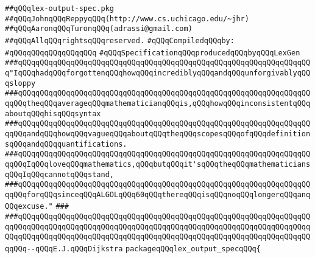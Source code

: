\label{src/app/future-lex/src/backends/lex-output-spec.pkg}
\verb|##qQQqlex-output-spec.pkg|\newline
\verb|##qQQqJohnqQQqReppyqQQq(http://www.cs.uchicago.edu/~jhr)|\newline
\verb|##qQQqAaronqQQqTuronqQQq(adrassi@gmail.com)|\newline
\verb|##qQQqAllqQQqrightsqQQqreserved.|\newline
\newline
\verb|#qQQqCompiledqQQqby:|\newline
\verb|#qQQqqQQqqQQqqQQqqQQq|\newline
\newline
\verb|#qQQqSpecificationqQQqproducedqQQqbyqQQqLexGen|\newline
\newline
\verb|###qQQqqQQqqQQqqQQqqQQqqQQqqQQqqQQqqQQqqQQqqQQqqQQqqQQqqQQqqQQqqQQqqQQq"IqQQqhadqQQqforgottenqQQqhowqQQqincrediblyqQQqandqQQqunforgivablyqQQqsloppy|\newline
\verb|###qQQqqQQqqQQqqQQqqQQqqQQqqQQqqQQqqQQqqQQqqQQqqQQqqQQqqQQqqQQqqQQqqQQqqQQqtheqQQqaverageqQQqmathematicianqQQqis,qQQqhowqQQqinconsistentqQQqaboutqQQqhisqQQqsyntax|\newline
\verb|###qQQqqQQqqQQqqQQqqQQqqQQqqQQqqQQqqQQqqQQqqQQqqQQqqQQqqQQqqQQqqQQqqQQqqQQqandqQQqhowqQQqvagueqQQqaboutqQQqtheqQQqscopesqQQqofqQQqdefinitionsqQQqandqQQqquantifications.|\newline
\verb|###qQQqqQQqqQQqqQQqqQQqqQQqqQQqqQQqqQQqqQQqqQQqqQQqqQQqqQQqqQQqqQQqqQQqqQQqIqQQqloveqQQqmathematics,qQQqbutqQQqit'sqQQqtheqQQqmathematiciansqQQqIqQQqcannotqQQqstand,|\newline
\verb|###qQQqqQQqqQQqqQQqqQQqqQQqqQQqqQQqqQQqqQQqqQQqqQQqqQQqqQQqqQQqqQQqqQQqqQQqforqQQqsinceqQQqALGOLqQQq60qQQqthereqQQqisqQQqnoqQQqlongerqQQqanqQQqexcuse."|\newline
\verb|###|\newline
\verb|###qQQqqQQqqQQqqQQqqQQqqQQqqQQqqQQqqQQqqQQqqQQqqQQqqQQqqQQqqQQqqQQqqQQqqQQqqQQqqQQqqQQqqQQqqQQqqQQqqQQqqQQqqQQqqQQqqQQqqQQqqQQqqQQqqQQqqQQqqQQqqQQqqQQqqQQqqQQqqQQqqQQqqQQqqQQqqQQqqQQqqQQqqQQqqQQqqQQqqQQqqQQqqQQqqQQq--qQQqE.J.qQQqDijkstra|\newline
\newline
\newline
\newline
\verb|packageqQQqlex_output_specqQQq{|\newline
\newline
